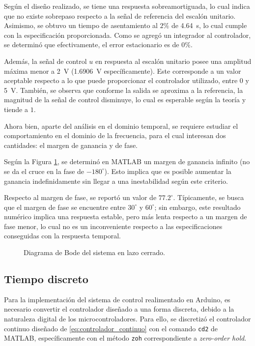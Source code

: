 Según el diseño realizado, se tiene una respuesta sobreamortiguada, lo cual indica que no existe sobrepaso respecto a la señal de referencia del escalón unitario.
Asimismo, se obtuvo un tiempo de asentamiento al $2\%$ de \SI{4.64}{\second}, lo cual cumple con la especificación proporcionada.
Como se agregó un integrador al controlador, se determinó que efectivamente, el error estacionario es de $0 \%$.

Además, la señal de control $u$ en respuesta al escalón unitario posee una amplitud máxima menor a \SI{2}{\volt} (\SI{1.6906}{\volt} específicamente).
Este corresponde a un valor aceptable respecto a lo que puede proporcionar el controlador utilizado, entre 0 y \SI{5}{\volt}.
También, se observa que conforme la salida se aproxima a la referencia, la magnitud de la señal de control disminuye, lo cual es esperable según la teoría y tiende a $1$.

Ahora bien, aparte del análisis en el dominio temporal, se requiere estudiar el comportamiento en el dominio de la frecuencia, para el cual interesan dos cantidades: el margen de ganancia y de fase.

Según la Figura \ref{fig:bode-lazo-cerrado}, se determinó en MATLAB un margen de ganancia infinito (no se da el cruce en la fase de $-180^\circ$).
Esto implica que es posible aumentar la ganancia indefinidamente sin llegar a una inestabilidad según este criterio.

Respecto al margen de fase, se reportó un valor de $77.2^\circ$.
Típicamente, se busca que el margen de fase se encuentre entre $30^\circ$ y $60^\circ$; sin embargo, este resultado numérico implica una respuesta estable, pero más lenta respecto a un margen de fase menor, lo cual no es un inconveniente respecto a las especificaciones conseguidas con la respuesta temporal.

\begin{figure}[htbp]
    \centering
    \caption{Diagrama de Bode del sistema en lazo cerrado.}
    \label{fig:bode-lazo-cerrado}
\end{figure}

\subsection{Tiempo discreto}

Para la implementación del sistema de control realimentado en Arduino, es necesario convertir el controlador diseñado a una forma discreta, debido a la naturaleza digital de los microcontroladores.
Para ello, se discretizó el controlador continuo diseñado de \eqref{eq:controlador_continuo} con el comando \texttt{cd2} de MATLAB, específicamente con el método \texttt{zoh} correspondiente a \textit{zero-order hold}.

